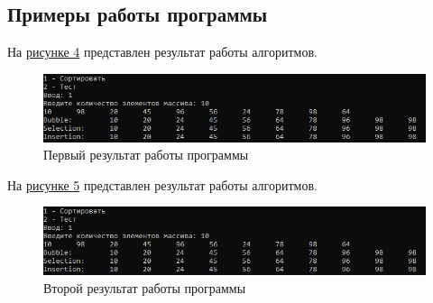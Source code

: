\documentclass[14pt, a4paper]{extarticle}
\begin{document}
\subsection{Примеры работы программы}
На \hyperref[Result1]{рисунке 4} представлен результат работы алгоритмов.
\begin{figure}[h!]
	\centering
	\includegraphics[scale=0.9]{source/Result1.png}
	\caption{Первый результат работы программы}
	\label{Result1}
\end{figure}\par
На \hyperref[Result2]{рисунке 5} представлен результат работы алгоритмов.
\begin{figure}[h!]
	\centering
	\includegraphics[scale=0.9]{source/Result1.png}
	\caption{Второй результат работы программы}
	\label{Result2}
\end{figure}
\clearpage
\end{document}
